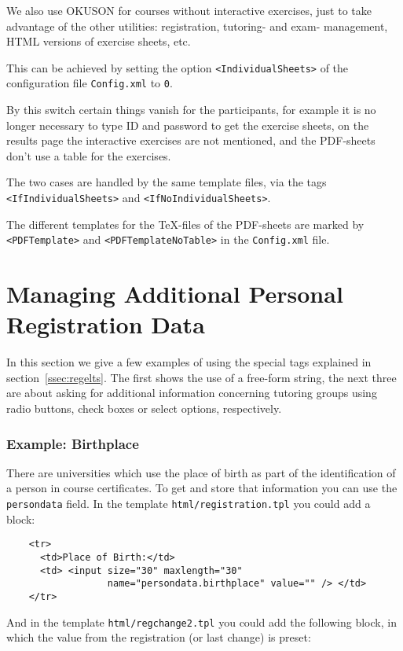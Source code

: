 \documentclass[12pt,openany,a4paper]{book}
\newcommand{\OKUSON}{\textsf{OKUSON}}
\begin{document}
We also use {\OKUSON} for courses without interactive exercises, just to
take advantage of the other utilities: registration, tutoring- and  exam-
management, HTML versions of exercise sheets, etc.

This can be achieved by setting the option \texttt{<IndividualSheets>} of 
the configuration file \texttt{Config.xml} to \texttt{0}.

By this switch certain things vanish for the participants, for example
it is no longer necessary to type ID and password to get the exercise
sheets, on the results page the interactive exercises are not mentioned,
and the PDF-sheets don't use a table for the exercises. 

The two cases are handled by the same template files, via the tags
\texttt{<IfIndividualSheets>} and \texttt{<IfNoIndividualSheets>}.

The different templates for the \TeX-files of the PDF-sheets are marked by
\texttt{<PDFTemplate>} and \texttt{<PDFTemplateNoTable>} in the 
\texttt{Config.xml} file.

\section{Managing Additional Personal Registration Data}

In this section we give a few examples of using the special tags explained
in section~\ref{ssec:regelts}. The first shows the use of a free-form
string, the next three are about asking for additional information
concerning tutoring groups using radio buttons, check boxes or select
options, respectively.

\subsubsection*{Example: Birthplace}

There are universities which use the place of birth as part of the
identification of a person in course certificates. To get and store that
information you can use the \texttt{persondata} field. In the template 
\texttt{html/registration.tpl} you could add a block:

\begin{verbatim}
    <tr>
      <td>Place of Birth:</td>
      <td> <input size="30" maxlength="30" 
                  name="persondata.birthplace" value="" /> </td>
    </tr>
\end{verbatim}

And in the template \texttt{html/regchange2.tpl} you could add the following
block, in which the value from the registration (or last change) is preset:
\end{document}
